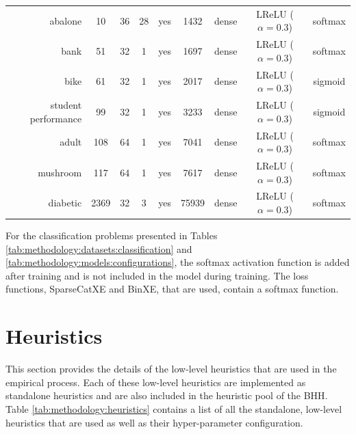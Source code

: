 \begin{table}[htbp]
{\begin{tabular}{rcccccccc}
                  abalone             & 10              & 36              & 28              & yes             & 1432                & dense             & LReLU ($\alpha = 0.3$) & softmax                \\
                  bank                & 51              & 32              & 1               & yes             & 1697                & dense             & LReLU ($\alpha = 0.3$) & softmax                \\
                  bike                & 61              & 32              & 1               & yes             & 2017                & dense             & LReLU ($\alpha = 0.3$) & sigmoid                \\
                  student performance & 99              & 32              & 1               & yes             & 3233                & dense             & LReLU ($\alpha = 0.3$) & sigmoid                \\
                  adult               & 108             & 64              & 1               & yes             & 7041                & dense             & LReLU ($\alpha = 0.3$) & softmax                \\
                  mushroom            & 117             & 64              & 1               & yes             & 7617                & dense             & LReLU ($\alpha = 0.3$) & softmax                \\
                  diabetic            & 2369            & 32              & 3               & yes             & 75939               & dense             & LReLU ($\alpha = 0.3$) & softmax                \\
            \end{tabular}%
      }
\end{table}%

\noindent
For the classification problems presented in Tables \ref{tab:methodology:datasets:classification} and \ref{tab:methodology:models:configurations}, the softmax activation function is added after training and is not included in the model during training. The loss functions, \acf{SparseCatXE} and \acf{BinXE}, that are used, contain a softmax function.

\section{Heuristics}\label{sec:methodology:heuristics}

This section provides the details of the low-level heuristics that are used in the empirical process. Each of these low-level heuristics are implemented as standalone heuristics and are also included in the heuristic pool of the \acs{BHH}. Table \ref{tab:methodology:heuristics} contains a list of all the standalone, low-level heuristics that are used as well as their hyper-parameter configuration.

